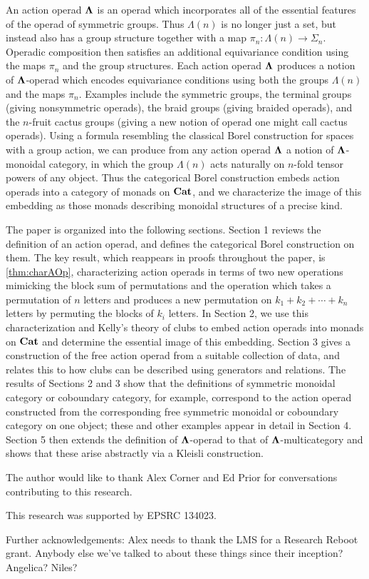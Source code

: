 An action operad $\mathbf{\Lambda}$ is an operad which incorporates all of the essential features of the operad of symmetric groups.  Thus $\Lambda(n)$ is no longer just a set, but instead also has a group structure together with a map $\pi_{n}:\Lambda(n) \to \Sigma_{n}$.  Operadic composition then satisfies an additional equivariance condition using the maps $\pi_n$ and the group structures.  Each action operad $\mathbf{\Lambda}$ produces a notion of $\mathbf{\Lambda}$-operad which encodes equivariance conditions using both the groups $\Lambda(n)$ and the maps $\pi_n$.  Examples include the symmetric groups, the terminal groups (giving nonsymmetric operads), the braid groups (giving braided operads), and the $n$-fruit cactus groups \cite{hk-cobound} (giving a new notion of operad one might call cactus operads).  Using a formula resembling the classical Borel construction for spaces with a group action, we can produce from any action operad $\mathbf{\Lambda}$ a notion of $\mathbf{\Lambda}$-monoidal category, in which the group $\Lambda(n)$ acts naturally on $n$-fold tensor powers of any object.  Thus the categorical Borel construction embeds action operads into a category of monads on $\mathbf{Cat}$, and we characterize the image of this embedding as those monads describing monoidal structures of a precise kind.

The paper is organized into the following sections.  Section 1 reviews the definition of an action operad, and defines the categorical Borel construction on them.  The key result, which reappears in proofs throughout the paper, is \cref{thm:charAOp}, characterizing action operads in terms of two new operations mimicking the block sum of permutations and the operation which takes a permutation of $n$ letters and produces a new permutation on $k_1 + k_2 + \cdots + k_n$ letters by permuting the blocks of $k_i$ letters.  In Section 2, we use this characterization and Kelly's theory of clubs \cite{kelly_club1, kelly_club0, kelly_club2} to embed action operads into monads on $\mathbf{Cat}$ and determine the essential image of this embedding.  Section 3 gives a construction of the free action operad from a suitable collection of data, and relates this to how clubs can be described using generators and relations.  The results of Sections 2 and 3 show that the definitions of symmetric monoidal category or coboundary category, for example, correspond to the action operad constructed from the corresponding free symmetric monoidal or coboundary category on one object; these and other examples appear in detail in Section 4.  Section 5 then extends the definition of $\mathbf{\Lambda}$-operad to that of $\mathbf{\Lambda}$-multicategory and shows that these arise abstractly via a Kleisli construction.

The author would like to thank Alex Corner and Ed Prior for conversations contributing to this research.

This research was supported by EPSRC 134023.

Further acknowledgements:
Alex needs to thank the LMS for a Research Reboot grant. Anybody else we've talked to about these things since their inception? Angelica? Niles?